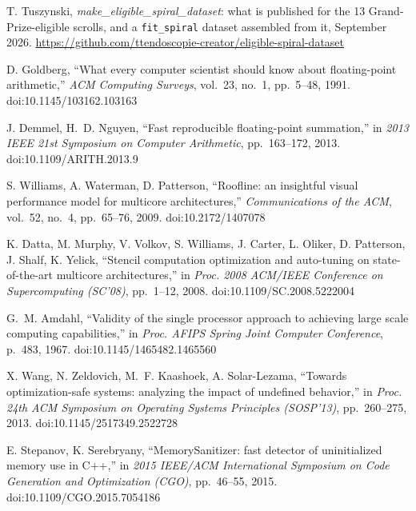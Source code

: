  T. Tuszynski, \emph{make\_eligible\_spiral\_dataset}: what is published for
  the 13 Grand-Prize-eligible scrolls, and a \texttt{fit\_spiral} dataset assembled from it,
  September 2026. \url{https://github.com/ttendoscopie-creator/eligible-spiral-dataset}


 D. Goldberg, ``What every computer scientist should know about
  floating-point arithmetic,'' \emph{ACM Computing Surveys}, vol.~23, no.~1, pp.~5--48, 1991.
  doi:10.1145/103162.103163

 J. Demmel, H.~D. Nguyen, ``Fast reproducible floating-point summation,''
  in \emph{2013 IEEE 21st Symposium on Computer Arithmetic}, pp.~163--172, 2013.
  doi:10.1109/ARITH.2013.9

 S. Williams, A. Waterman, D. Patterson, ``Roofline: an insightful visual
  performance model for multicore architectures,'' \emph{Communications of the ACM}, vol.~52,
  no.~4, pp.~65--76, 2009. doi:10.2172/1407078

 K. Datta, M. Murphy, V. Volkov, S. Williams, J. Carter, L. Oliker,
  D. Patterson, J. Shalf, K. Yelick, ``Stencil computation optimization and auto-tuning on
  state-of-the-art multicore architectures,'' in \emph{Proc. 2008 ACM/IEEE Conference on
  Supercomputing (SC'08)}, pp.~1--12, 2008. doi:10.1109/SC.2008.5222004

 G.~M. Amdahl, ``Validity of the single processor approach to achieving
  large scale computing capabilities,'' in \emph{Proc. AFIPS Spring Joint Computer Conference},
  p.~483, 1967. doi:10.1145/1465482.1465560

 X. Wang, N. Zeldovich, M.~F. Kaashoek, A. Solar-Lezama, ``Towards
  optimization-safe systems: analyzing the impact of undefined behavior,'' in \emph{Proc. 24th
  ACM Symposium on Operating Systems Principles (SOSP'13)}, pp.~260--275, 2013.
  doi:10.1145/2517349.2522728

 E. Stepanov, K. Serebryany, ``MemorySanitizer: fast detector of
  uninitialized memory use in C++,'' in \emph{2015 IEEE/ACM International Symposium on Code
  Generation and Optimization (CGO)}, pp.~46--55, 2015. doi:10.1109/CGO.2015.7054186

